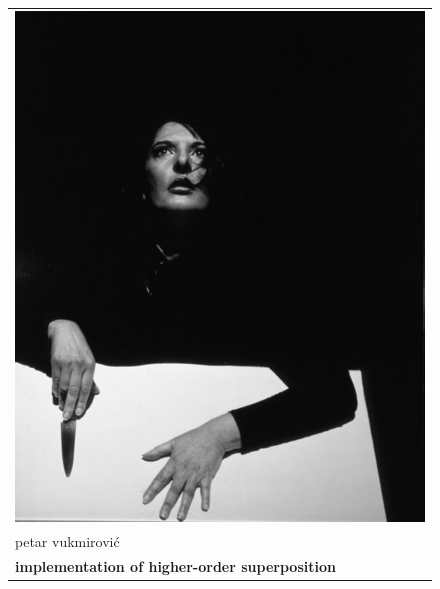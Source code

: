 
\thispagestyle{empty}
\addtocounter{page}{-1}


    \begin{figure}[p]
        \centering
        \begin{tabular}[t]{l}
            \includegraphics[width=\widthof{\textsf{\textbf{\Large implementation of higher-order superposition}}}]{cover/rythm-10.jpg} \\[2\jot]
            \textsf{\large petar vukmirović} \\[\jot]
            \textsf{\textbf{\Large implementation of higher-order superposition}}
        \end{tabular}
    \end{figure}
    
    
